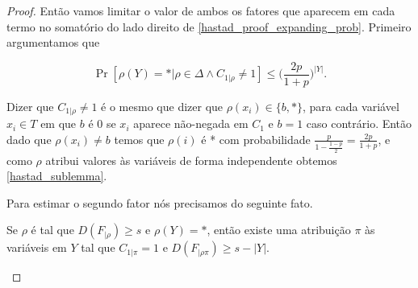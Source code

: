 \begin{proof}

Então vamos limitar o valor de ambos os fatores que aparecem em cada termo no somatório do lado direito de \ref{hastad_proof_expanding_prob}. Primeiro argumentamos que

\begin{equation} \label{hastad_sublemma}
	\Pr[\rho(Y) = * \lvert \rho \in \Delta \land C_{1 \lvert \rho} \neq 1] \leq \Big(\frac{2p}{1 + p} \Big)^{\lvert Y \rvert}.
\end{equation}

Dizer que $C_{1 \lvert \rho} \neq 1$ é o mesmo que dizer que $\rho(x_{i}) \in \{b, *\}$, para cada variável $x_{i} \in T$ em que $b$ é 0 se $x_{i}$ aparece não-negada em $C_{1}$ e $b = 1$ caso contrário. Então dado que $\rho(x_{i}) \neq b$ temos que $\rho(i)$ é * com probabilidade $\frac{p}{1 - \frac{1-  p}{2}} = \frac{2p}{1 + p}$, e como $\rho$ atribui valores às variáveis de forma independente obtemos \ref{hastad_sublemma}.

Para estimar o segundo fator nós precisamos do seguinte fato.

\begin{fato} \label{extending_rho}

    Se $\rho$ é tal que $D(F_{\lvert \rho}) \geq s$ e $\rho(Y) = *$, então existe uma atribuição $\pi$ às variáveis em $Y$ tal que $C_{1 \lvert \pi} = 1$ e $D(F_{\lvert \rho\pi}) \geq s - \lvert Y \rvert$.

\end{fato}



\end{proof}
